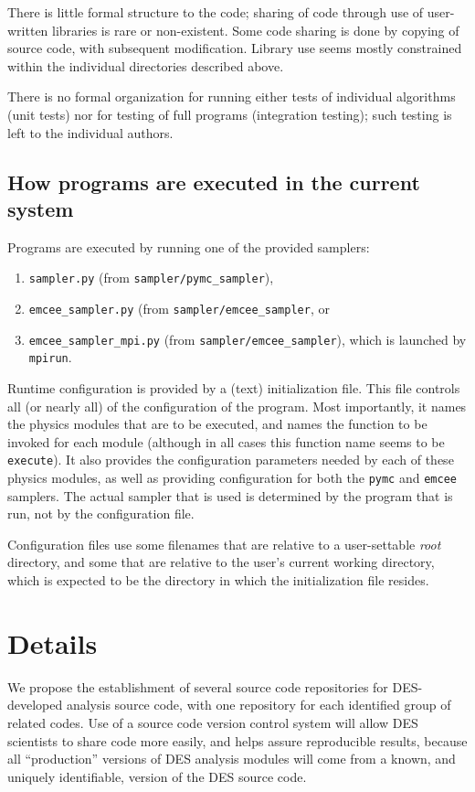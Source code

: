 \documentclass[draftmode,draftwater]{memarticle}
\newcommand{\prog}[1]%
  {\texttt{#1}}
\begin{document}
There is little formal structure to the code; sharing of code through
use of user-written libraries is rare or non-existent. Some code sharing
is done by copying of source code, with subsequent modification. Library
use seems mostly constrained within the individual directories described
above.

There is no formal organization for running either tests of individual
algorithms (unit tests) nor for testing of full programs (integration
testing); such testing is left to the individual authors.

\section{How programs are executed in the current system}

Programs are executed by running one of the provided samplers:
\begin{enumerate}
\item \prog{sampler.py} (from \prog{sampler/pymc\_sampler}),
\item \prog{emcee\_sampler.py} (from \prog{sampler/emcee\_sampler}, or
\item \prog{emcee\_sampler\_mpi.py} (from
  \prog{sampler/emcee\_sampler}), which is launched by \prog{mpirun}.
\end{enumerate}

Runtime configuration is provided by a (text) initialization file. This
file controls all (or nearly all) of the configuration of the program.
Most importantly, it names the physics modules that are to be executed,
and names the function to be invoked for each module (although in all
cases this function name seems to be \texttt{execute}). It also provides
the configuration parameters needed by each of these physics modules, as
well as providing configuration for both the \texttt{pymc} and
\texttt{emcee} samplers. The actual sampler that is used is determined
by the program that is run, not by the configuration file.

Configuration files use some filenames that are relative to a
user-settable \emph{root} directory, and some that are relative to the
user's current working directory, which is expected to be the directory
in which the initialization file resides.

\chapter{Details}

We propose the establishment of several source code repositories for
DES-developed analysis source code, with one repository for each
identified group of related codes. Use of a source code version control
system will allow DES scientists to share code more easily, and helps
assure reproducible results, because all ``production'' versions of DES
analysis modules will come from a known, and uniquely identifiable,
version of the DES source code.
\end{document}
